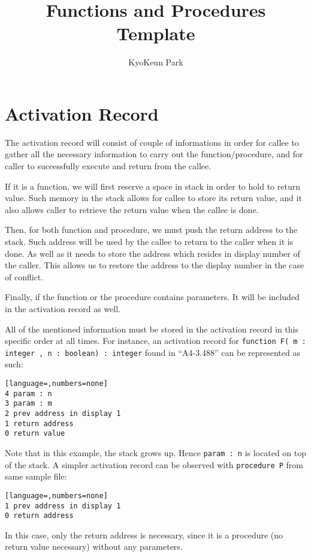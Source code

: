 \documentclass{article}
\title{Functions and Procedures Template}
\author{KyoKeun Park}
\begin{document}
\maketitle

\section{Activation Record} \label{rec}

The activation record will consist of couple of informations in order for callee to gather all the necessary information to carry out the function/procedure, and for caller to successfully execute and return from the callee.

If it is a function, we will first reserve a space in stack in order to hold to return value. Such memory in the stack allows for callee to store its return value, and it also allows caller to retrieve the return value when the callee is done.

Then, for both function and procedure, we must push the return address to the stack. Such address will be used by the callee to return to the caller when it is done. As well as it needs to store the address which resides in display number of the caller. This allows us to restore the address to the display number in the case of conflict.

Finally, if the function or the procedure contains parameters. It will be included in the activation record as well.

All of the mentioned information must be stored in the activation record in this specific order at all times. For instance, an activation record for {\tt function F( m : integer , n : boolean) : integer} found in ``A4-3.488'' can be represented as such:

\begin{lstlisting}[language=,numbers=none]
4 param : n
3 param : m
2 prev address in display 1
1 return address
0 return value
\end{lstlisting}

Note that in this example, the stack grows up. Hence {\tt param : n} is located on top of the stack. A simpler activation record can be observed with {\tt procedure P} from same sample file:

\begin{lstlisting}[language=,numbers=none]
1 prev address in display 1
0 return address
\end{lstlisting}

In this case, only the return address is necessary, since it is a procedure (no return value necessary) without any parameters.
\end{document}
